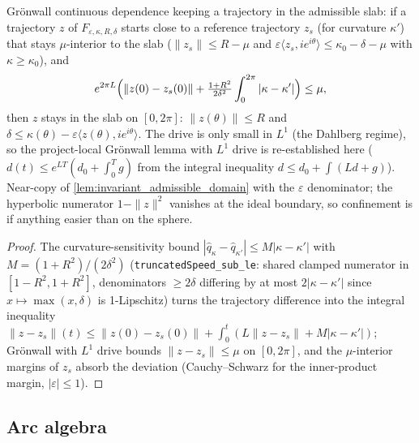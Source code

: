 \begin{lemma}
  \label{lem:spaceform_invariant_admissible}
  Gr\"onwall continuous dependence keeping a trajectory in the admissible
  slab: if a trajectory $z$ of $F_{\varepsilon,\kappa,R,\delta}$ starts close
  to a reference trajectory $z_s$ (for curvature $\kappa'$) that stays
  $\mu$-interior to the slab ($\|z_s\|\le R-\mu$ and
  $\varepsilon\langle z_s,ie^{i\theta}\rangle\le\kappa_0-\delta-\mu$ with
  $\kappa\ge\kappa_0$), and
  \[
    e^{2\pi L}\Bigl(\|z(0)-z_s(0)\|
      +\tfrac{1+R^2}{2\delta^2}\int_0^{2\pi}|\kappa-\kappa'|\Bigr)\le\mu,
  \]
  then $z$ stays in the slab on $[0,2\pi]$: $\|z(\theta)\|\le R$ and
  $\delta\le\kappa(\theta)-\varepsilon\langle z(\theta),
  ie^{i\theta}\rangle$. The drive is only small in $L^1$ (the Dahlberg
  regime), so the project-local Gr\"onwall lemma with $L^1$ drive is
  re-established here ($d(t)\le e^{LT}(d_0+\int_0^T g)$ from the integral
  inequality $d\le d_0+\int(Ld+g)$). Near-copy of
  \cref{lem:invariant_admissible_domain} with the $\varepsilon$
  denominator; the hyperbolic numerator $1-\|z\|^2$ vanishes at the ideal
  boundary, so confinement is if anything easier than on the sphere.
\end{lemma}

\begin{proof}
  \leanok
  The curvature-sensitivity bound
  $|\hat q_{\kappa}-\hat q_{\kappa'}|\le M|\kappa-\kappa'|$ with
  $M=(1+R^2)/(2\delta^2)$ (\texttt{truncatedSpeed\_sub\_le}: shared clamped
  numerator in $[1-R^2,1+R^2]$, denominators $\ge2\delta$ differing by at
  most $2|\kappa-\kappa'|$ since $x\mapsto\max(x,\delta)$ is 1-Lipschitz)
  turns the trajectory difference into the integral inequality
  $\|z-z_s\|(t)\le\|z(0)-z_s(0)\|+\int_0^t(L\|z-z_s\|+M|\kappa-\kappa'|)$;
  Gr\"onwall with $L^1$ drive bounds $\|z-z_s\|\le\mu$ on $[0,2\pi]$, and the
  $\mu$-interior margins of $z_s$ absorb the deviation
  (Cauchy--Schwarz for the inner-product margin, $|\varepsilon|\le1$).
\end{proof}

\subsection{Arc algebra}

